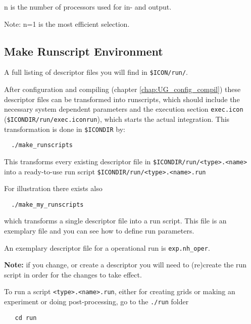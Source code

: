 n is the number of processors used for in- and output. 

Note: n=1 is the most efficient selection.


\subsection{Make Runscript Environment}\label{sec:make_runscript}


A full listing of descriptor files you will find in \verb+$ICON/run/+. 

After configuration and compiling (chapter \ref{chap:UG_config_compil}) these descriptor files can be transformed into runscripts, which should include the necessary system dependent parameters and the execution section \verb+exec.icon+ (\verb+$ICONDIR/run/exec.iconrun+), which starts the actual integration. This transformation is done in \verb+$ICONDIR+ by:

\begin{small}
 \begin{verbatim}
  ./make_runscripts
 \end{verbatim}
\end{small}

This transforms every existing descriptor file in \verb+$ICONDIR/run/<type>.<name>+ into a ready-to-use run script \verb+$ICONDIR/run/<type>.<name>.run+

For illustration there exists also 

\begin{small}
 \begin{verbatim}
  ./make_my_runscripts
 \end{verbatim}
\end{small}

which transforms a single descriptor file into a run script. This file is an exemplary file and you can see how to define run parameters.

An exemplary descriptor file for a operational run is \verb+exp.nh_oper+.

\textbf{Note:} if you change, or create a descriptor you will need to (re)create the run script in order for the changes to take effect.

To run a script \verb+<type>.<name>.run+, either for creating grids or making an experiment or doing post-processing, go to the \verb+./run+ folder

\begin{small}
  \begin{verbatim}
   cd run
  \end{verbatim}
\end{small}

